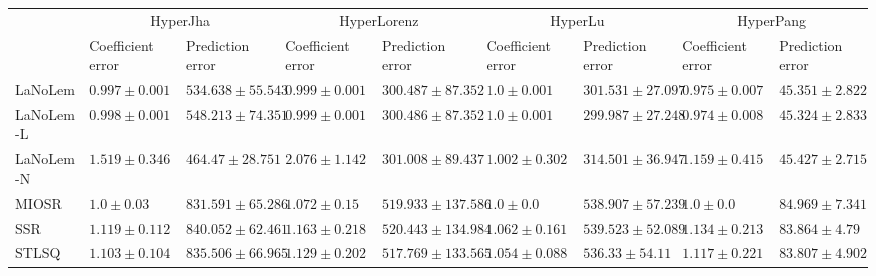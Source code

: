 \begin{table*}
{\begin{tabular}{lllllllll}
 & \multicolumn{2}{c}{HyperJha} & \multicolumn{2}{c}{HyperLorenz} & \multicolumn{2}{c}{HyperLu} & \multicolumn{2}{c}{HyperPang} \\
 & Coefficient error & Prediction error & Coefficient error & Prediction error & Coefficient error & Prediction error & Coefficient error & Prediction error \\
\midrule
LaNoLem & $\mathbf{0.997}\pm 0.001$ & $534.638\pm 55.543$ & $\mathbf{0.999}\pm 0.001$ & $300.487\pm 87.352$ & $1.0\pm 0.001$ & $301.531\pm 27.097$ & $0.975\pm 0.007$ & $45.351\pm 2.822$ \\
LaNoLem-L & $0.998\pm 0.001$ & $548.213\pm 74.351$ & $0.999\pm 0.001$ & $\mathbf{300.486}\pm 87.352$ & $\mathbf{1.0}\pm 0.001$ & $\mathbf{299.987}\pm 27.248$ & $\mathbf{0.974}\pm 0.008$ & $\mathbf{45.324}\pm 2.833$ \\
LaNoLem-N & $1.519\pm 0.346$ & $\mathbf{464.47}\pm 28.751$ & $2.076\pm 1.142$ & $301.008\pm 89.437$ & $1.002\pm 0.302$ & $314.501\pm 36.947$ & $1.159\pm 0.415$ & $45.427\pm 2.715$ \\
MIOSR & $1.0\pm 0.03$ & $831.591\pm 65.286$ & $1.072\pm 0.15$ & $519.933\pm 137.586$ & $1.0\pm 0.0$ & $538.907\pm 57.239$ & $1.0\pm 0.0$ & $84.969\pm 7.341$ \\
SSR & $1.119\pm 0.112$ & $840.052\pm 62.461$ & $1.163\pm 0.218$ & $520.443\pm 134.984$ & $1.062\pm 0.161$ & $539.523\pm 52.089$ & $1.134\pm 0.213$ & $83.864\pm 4.79$ \\
STLSQ & $1.103\pm 0.104$ & $835.506\pm 66.965$ & $1.129\pm 0.202$ & $517.769\pm 133.565$ & $1.054\pm 0.088$ & $536.33\pm 54.11$ & $1.117\pm 0.221$ & $83.807\pm 4.902$ \\

\midrule


\end{tabular}}
\end{table*}
